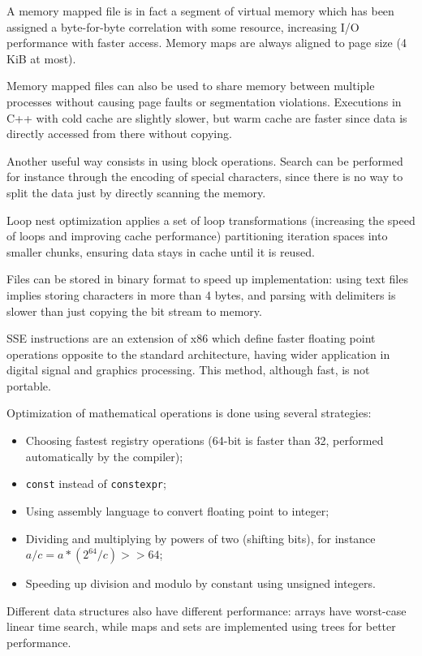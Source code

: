 A memory mapped file is in fact a segment of virtual memory which has been assigned a byte-for-byte correlation with some resource, increasing I/O performance with faster access. Memory maps are always aligned to page size (4 KiB at most).

Memory mapped files can also be used to share memory between multiple processes without causing page faults or segmentation violations. Executions in C++ with cold cache are slightly slower, but warm cache are faster since data is directly accessed from there without copying.

Another useful way consists in using block operations. Search can be performed for instance through the encoding of special characters, since there is no way to split the data just by directly scanning the memory.

Loop nest optimization applies a set of loop transformations (increasing the speed of loops and improving cache performance) partitioning iteration spaces into smaller chunks, ensuring data stays in cache until it is reused.

Files can be stored in binary format to speed up implementation: using text files implies storing characters in more than 4 bytes, and parsing with delimiters is slower than just copying the bit stream to memory.

SSE instructions are an extension of x86 which define faster floating point operations opposite to the standard architecture, having wider application in digital signal and graphics processing. This method, although fast, is not portable. 

Optimization of mathematical operations is done using several strategies:
\begin{itemize}
	\item Choosing fastest registry operations (64-bit is faster than 32, performed automatically by the compiler);
	\item \texttt{const} instead of \texttt{constexpr};
	\item Using assembly language to convert floating point to integer;
	\item Dividing and multiplying by powers of two (shifting bits), for instance $a / c = a * (2^{64} / c) >> 64$;
	\item Speeding up division and modulo by constant using unsigned integers.
\end{itemize}

Different data structures also have different performance: arrays have worst-case linear time search, while maps and sets are implemented using trees for better performance.

